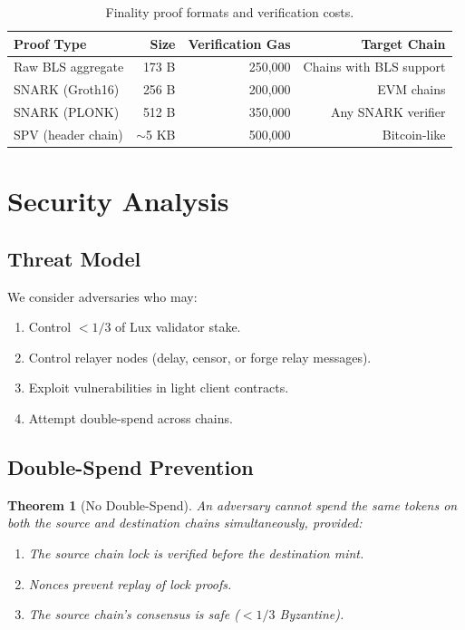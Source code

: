 \documentclass[11pt,a4paper]{article}
\newtheorem{theorem}{Theorem}
\begin{document}
\begin{table}[H]
\centering
\caption{Finality proof formats and verification costs.}
\label{tab:finality}
\begin{tabular}{lrrr}
\toprule
\textbf{Proof Type} & \textbf{Size} & \textbf{Verification Gas} & \textbf{Target Chain} \\
\midrule
Raw BLS aggregate & 173 B & 250,000 & Chains with BLS support \\
SNARK (Groth16) & 256 B & 200,000 & EVM chains \\
SNARK (PLONK) & 512 B & 350,000 & Any SNARK verifier \\
SPV (header chain) & $\sim$5 KB & 500,000 & Bitcoin-like \\
\bottomrule
\end{tabular}
\end{table}

\section{Security Analysis}\label{sec:security}

\subsection{Threat Model}

We consider adversaries who may:
\begin{enumerate}
    \item Control $< 1/3$ of Lux validator stake.
    \item Control relayer nodes (delay, censor, or forge relay messages).
    \item Exploit vulnerabilities in light client contracts.
    \item Attempt double-spend across chains.
\end{enumerate}

\subsection{Double-Spend Prevention}

\begin{theorem}[No Double-Spend]
An adversary cannot spend the same tokens on both the source and destination chains simultaneously, provided:
\begin{enumerate}
    \item The source chain lock is verified before the destination mint.
    \item Nonces prevent replay of lock proofs.
    \item The source chain's consensus is safe ($< 1/3$ Byzantine).
\end{enumerate}
\end{theorem}
\end{document}
